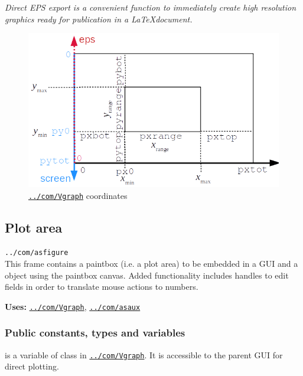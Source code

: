 \documentclass[12pt]{article}
\newcommand\code[1]{{\tt #1}}
\newcommand\guifco[1]{{\color{violet}\code{#1}}}
\newcommand{\opaguif}[1]{\colorbox{violet!30}{\code{#1}}}
\newcommand{\oguifh}[2]{\subsection{\label{#2}#1}{\Huge\opaguif{#2}}\\}
\newcommand{\oguif}[1]{\hyperref[#1]{\opaguif{#1}}}
\newcommand{\opauni}[1]{\colorbox{orange!30}{\code{#1}}}
\newcommand{\ouni}[1]{\hyperref[#1]{\opauni{#1}}}
\newcommand{\uses}[1]{{\bf Uses: } #1}
\newcommand{\pvar}[1]{\subsubsection*{Public constants, types and variables} #1}
\newcommand{\feature}[1]{{\color{cadmiumgreen}\em #1}}
\begin{document}
\feature{Direct EPS export is a convenient function to immediately create high resolution graphics ready for publication in a \LaTeX document.}


\begin{figure}\centering
\includegraphics[scale=0.8]{vplotcoor.png}
\caption{\label{vprange}\oguif{../com/Vgraph} coordinates}
\end{figure}



\oguifh{Plot area}{../com/asfigure}
This frame contains a paintbox (i.e. a plot area) to be embedded in a GUI and a \guifco{Vplot} object using the paintbox canvas. 
Added functionality includes handles to edit fields in order to translate mouse actions to numbers. 

\uses{\oguif{../com/Vgraph}, \ouni{../com/asaux}}

\pvar{
\guifco{plot} is a variable of class \guifco{Vplot} in \oguif{../com/Vgraph}. It is accessible to the parent GUI for direct plotting.

}
\end{document}
